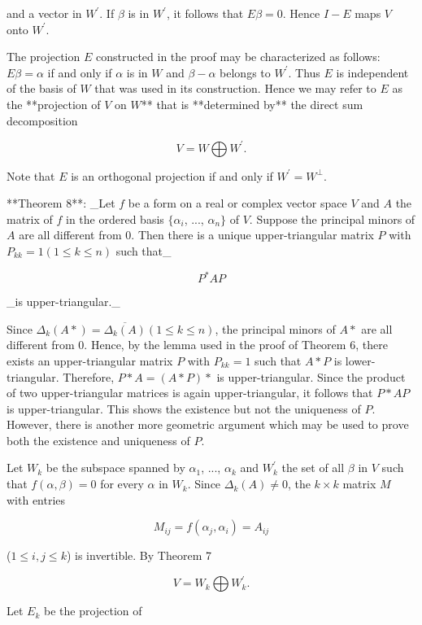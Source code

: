 and a vector in \(W^{\prime}\). If \(\beta\) is in \(W^{\prime}\), it follows that \(E\beta=0\). Hence \(I-E\) maps \(V\) onto \(W^{\prime}\).

The projection \(E\) constructed in the proof may be characterized as follows: \(E\beta=\alpha\) if and only if \(\alpha\) is in \(W\) and \(\beta-\alpha\) belongs to \(W^{\prime}\). Thus \(E\) is independent of the basis of \(W\) that was used in its construction. Hence we may refer to \(E\) as the **projection of \(V\) on \(W\)** that is **determined by** the direct sum decomposition

\[V=W\bigoplus W^{\prime}.\]

Note that \(E\) is an orthogonal projection if and only if \(W^{\prime}=W^{\perp}\).

**Theorem 8**: _Let \(f\) be a form on a real or complex vector space \(V\) and \(A\) the matrix of \(f\) in the ordered basis \(\{\alpha_{i}\), ..., \(\alpha_{n}\}\) of \(V\). Suppose the principal minors of \(A\) are all different from \(0\). Then there is a unique upper-triangular matrix \(P\) with \(P_{kk}=1\)\((1\leq k\leq n)\) such that_

\[P^{*}AP\]

_is upper-triangular._

Since \(\Delta_{k}(A*)=\overline{\Delta_{k}(A)}\)\((1\leq k\leq n)\), the principal minors of \(A*\) are all different from \(0\). Hence, by the lemma used in the proof of Theorem 6, there exists an upper-triangular matrix \(P\) with \(P_{kk}=1\) such that \(A*P\) is lower-triangular. Therefore, \(P*A=(A*P)*\) is upper-triangular. Since the product of two upper-triangular matrices is again upper-triangular, it follows that \(P*AP\) is upper-triangular. This shows the existence but not the uniqueness of \(P\). However, there is another more geometric argument which may be used to prove both the existence and uniqueness of \(P\).

Let \(W_{k}\) be the subspace spanned by \(\alpha_{1}\), ..., \(\alpha_{k}\) and \(W^{\prime}_{k}\) the set of all \(\beta\) in \(V\) such that \(f(\alpha,\beta)=0\) for every \(\alpha\) in \(W_{k}\). Since \(\Delta_{k}(A)\neq 0\), the \(k\times k\) matrix \(M\) with entries

\[M_{ij}=f(\alpha_{j},\alpha_{i})=A_{ij}\]

(\(1\leq i,j\leq k\)) is invertible. By Theorem 7

\[V=W_{k}\bigoplus W^{\prime}_{k}.\]

Let \(E_{k}\) be the projection of \ 